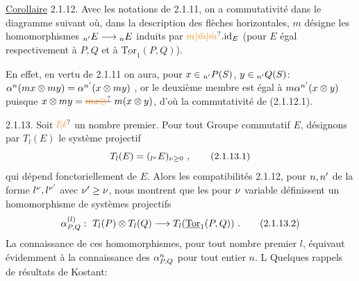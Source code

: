 \uline{Corollaire} 2.1.12. Avec les notations de 2.1.11, on a commutativité dans le diagramme suivant
\margin{\handwritten{$\Bigg|$}}
où, dans la description des flèches horizontales, $m$ désigne les homomorphismes $\mathord{}_{n'}E\longrightarrow{}_nE$ induits par $\unsure{m|\bar m|\dot m}.\mathrm{id}_E$ (pour $E$ égal respectivement à $P,Q$ et à $\underline{\mathrm{Tor}}_1(P,Q)$).

En effet, en vertu de \deleted{(}2.1.11 on aura, pour $x\in{}_{n'}P(S)$, $y\in{}_{n'}Q(S)$: $\alpha^n(mx\otimes my)=\alpha^{n'}(x\otimes my)$ , or le deuxième membre est égal à $m\alpha^{n'}(x\otimes y)$ puisque $x\otimes my=\deleted{\unsure{mx\otimes}}\ m(x\otimes y)$, d'où la commutativité de (2.1.12.1).

2.1.13. Soit $\unsure{l|\ell}$ un nombre premier. Pour tout Groupe commutatif $E$, désignons par $T_l(E)$ le système projectif 
\[
T_l(E)=({}_{l^{\handwritten{\nu}}}E)_{\handwritten{\nu\geq}0}\ ,\tag*{(2.1.13.1)}
\]
qui dépend  fonctoriellement de $E$. Alors les compatibilités 2.1.12, pour $n,n'$ de la forme $l^{\nu},l^{\nu'}$ avec $\nu'\geq\nu$, nous montrent que les
 pour $\nu$ variable définissent un homomorphisme de systèmes projectifs\handwritten{,} 
\[
\handwritten{\alpha}^{(l)}_{P,Q}\handwritten{:}\ T_l(P)\otimes T_l(Q)\handwritten{\longrightarrow}T_l(\underline{\mathrm{Tor}}_1(P,Q))\ .\tag*{(2.1.13.2)}
\]
La connaissance de ces homomorphismes, pour tout nombre premier $l$, équivaut évidemment à la connaissance des $\alpha_{P,Q}^n$ pour tout entier $n$. L
Quelques rappels de résultats de Kostant:

